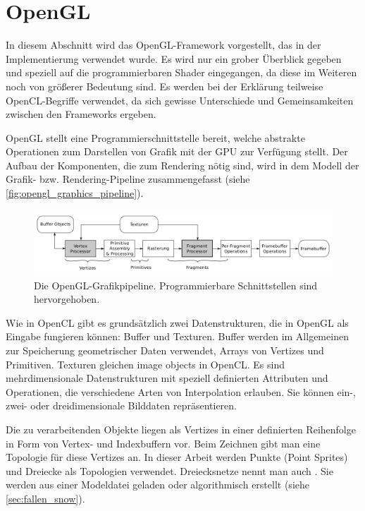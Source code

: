 \section{OpenGL}
\label{sec:opengl}

In diesem Abschnitt wird das OpenGL-Framework vorgestellt, das in der
Implementierung verwendet wurde. Es wird nur ein grober Überblick
gegeben und speziell auf die programmierbaren Shader eingegangen, da
diese im Weiteren noch von größerer Bedeutung sind. Es werden bei der
Erklärung teilweise OpenCL-Begriffe verwendet, da sich gewisse
Unterschiede und Gemeinsamkeiten zwischen den Frameworks ergeben.

OpenGL stellt eine Programmierschnittstelle bereit, welche abstrakte
Operationen zum Darstellen von Grafik mit der GPU zur Verfügung
stellt. Der Aufbau der Komponenten, die zum Rendering nötig sind, wird
in dem Modell der Grafik- bzw. Rendering-Pipeline zusammengefasst
(siehe \autoref{fig:opengl_graphics_pipeline}).

\begin{figure}[ht]
\centering
\includegraphics[width=15cm]{images/graphics_pipeline}
\caption{Die OpenGL-Grafikpipeline. Programmierbare Schnittstellen sind hervorgehoben.}
\label{fig:opengl_graphics_pipeline}
\end{figure}

Wie in OpenCL gibt es grundsätzlich zwei Datenstrukturen, die in
OpenGL als Eingabe fungieren können: Buffer und Texturen. Buffer
werden im Allgemeinen zur Speicherung geometrischer Daten verwendet,
\Pimiddydh Arrays von Vertizes und Primitiven. Texturen gleichen image
objects in OpenCL. Es sind mehrdimensionale Datenstrukturen mit
speziell definierten Attributen und Operationen, die \PimiddyzB
verschiedene Arten von Interpolation erlauben. Sie können ein-, zwei-
oder dreidimensionale Bilddaten repräsentieren.

Die zu verarbeitenden Objekte liegen als Vertizes in einer definierten
Reihenfolge in Form von Vertex- und Indexbuffern vor. Beim Zeichnen
gibt man eine Topologie für diese Vertizes an. In dieser Arbeit werden
Punkte (Point Sprites) und Dreiecke als Topologien
verwendet. Dreiecksnetze nennt man auch . Sie
werden \PimiddyzB aus einer Modeldatei geladen oder algorithmisch
erstellt (siehe \autoref{sec:fallen_snow}).

